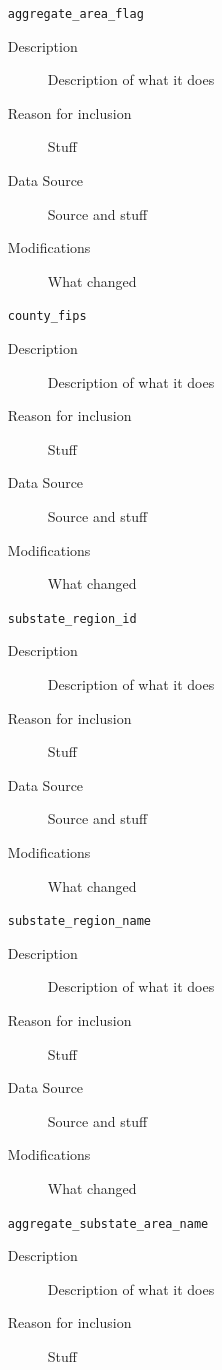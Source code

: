 \documentclass{article}
\begin{document}
\begin{itemize}[label={}, align=left]
	\item[\texttt{aggregate\_area\_flag}] \
	      \begin{description}
		      \item[Description] Description of what it does
		      \item[Reason for inclusion] Stuff
		      \item[Data Source] Source and stuff
		      \item[Modifications] What changed
	      \end{description}
	\item[\texttt{county\_fips}] \
	      \begin{description}
		      \item[Description] Description of what it does
		      \item[Reason for inclusion] Stuff
		      \item[Data Source] Source and stuff
		      \item[Modifications] What changed
	      \end{description}
	\item[\texttt{substate\_region\_id}] \
	      \begin{description}
		      \item[Description] Description of what it does
		      \item[Reason for inclusion] Stuff
		      \item[Data Source] Source and stuff
		      \item[Modifications] What changed
	      \end{description}
	\item[\texttt{substate\_region\_name}] \
	      \begin{description}
		      \item[Description] Description of what it does
		      \item[Reason for inclusion] Stuff
		      \item[Data Source] Source and stuff
		      \item[Modifications] What changed
	      \end{description}
	\item[\texttt{aggregate\_substate\_area\_name}] \
	      \begin{description}
		      \item[Description] Description of what it does
		      \item[Reason for inclusion] Stuff

\end{description}
\end{itemize}
\end{document}
